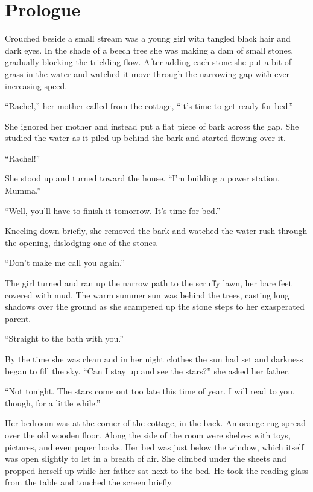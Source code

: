 
\chapter{Prologue}

Crouched beside a small stream was a young girl with tangled black hair and dark eyes. In the
shade of a beech tree she was making a dam of small stones, gradually blocking the trickling
flow. After adding each stone she put a bit of grass in the water and watched it move through
the narrowing gap with ever increasing speed.

``Rachel,'' her mother called from the cottage, ``it's time to get ready for bed.''

She ignored her mother and instead put a flat piece of bark across the gap. She studied the
water as it piled up behind the bark and started flowing over it.

``Rachel!''

She stood up and turned toward the house. ``I'm building a power station, Mumma.''

``Well, you'll have to finish it tomorrow. It's time for bed.''

Kneeling down briefly, she removed the bark and watched the water rush through the opening,
dislodging one of the stones.

``Don't make me call you again.''

The girl turned and ran up the narrow path to the scruffy lawn, her bare feet covered with mud.
The warm summer sun was behind the trees, casting long shadows over the ground as she scampered
up the stone steps to her exasperated parent.

``Straight to the bath with you.''

By the time she was clean and in her night clothes the sun had set and darkness began to fill
the sky. ``Can I stay up and see the stars?'' she asked her father.

``Not tonight. The stars come out too late this time of year. I will read to you, though, for a
little while.''

Her bedroom was at the corner of the cottage, in the back. An orange rug spread over the old
wooden floor. Along the side of the room were shelves with toys, pictures, and even paper books.
Her bed was just below the window, which itself was open slightly to let in a breath of air. She
climbed under the sheets and propped herself up while her father sat next to the bed. He took
the reading glass from the table and touched the screen briefly.


